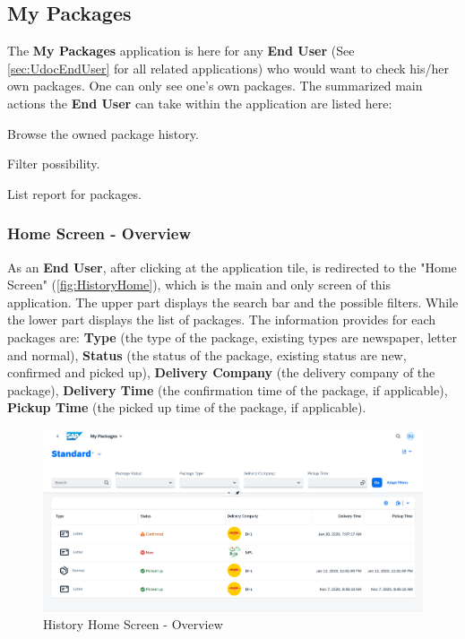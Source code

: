 \subsection{My Packages}
\label{subsec:ph}

The \textbf{My Packages} application is here for any \textbf{End User} (See \autoref{sec:UdocEndUser} for all related applications) who would want to check his/her own packages. One can only see one's own packages. 
The summarized main actions the \textbf{End User} can take within the application are listed here:

\begin{compactenum}
	\item Browse the owned package history.
        \begin{compactenum}
        	\item Filter possibility.
            \item List report for packages.
        \end{compactenum}
\end{compactenum}

\subsubsection{Home Screen - Overview}
As an \textbf{End User}, after clicking at the application tile, is redirected to the "Home Screen" (\autoref{fig:HistoryHome}), which is the main and only screen of this application. The upper part displays the search bar and the possible filters. While the lower part displays the list of packages. The information provides for each packages are: \textbf{Type} (the type of the package, existing types are newspaper, letter and normal), \textbf{Status} (the status of the package, existing status are new, confirmed and picked up), \textbf{Delivery Company} (the delivery company of the package), \textbf{Delivery Time} (the confirmation time of the package, if applicable), \textbf{Pickup Time} (the picked up time of the package, if applicable).

\begin{figure}[H]
	\centering
	\includegraphics[width=1\linewidth]{images/user_doc/myPack/overview.png}
	\caption{History Home Screen - Overview}
	\label{fig:HistoryHome}
\end{figure}

